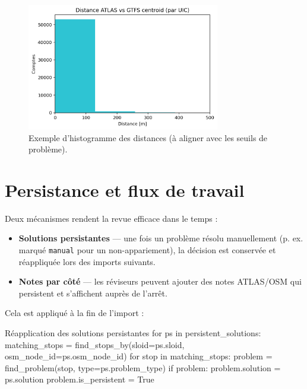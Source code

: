 \begin{figure}[h]
  \centering
  \includegraphics[width=0.75\textwidth]{../figures/plots/atlas_vs_gtfs_distance_hist.png}
  \caption{Exemple d'histogramme des distances (à aligner avec les seuils de problème).}
\end{figure}

\section{Persistance et flux de travail}
\label{sec:persist-workflow}
Deux mécanismes rendent la revue efficace dans le temps :
\begin{itemize}
  \item \textbf{Solutions persistantes} — une fois un problème résolu manuellement (p. ex. marqué \texttt{manual} pour un non-appariement), la décision est conservée et réappliquée lors des imports suivants.
  \item \textbf{Notes par côté} — les réviseurs peuvent ajouter des notes ATLAS/OSM qui persistent et s'affichent auprès de l'arrêt.
\end{itemize}

\noindent Cela est appliqué à la fin de l'import :
\begin{codebox}[language=Python]{Réapplication des solutions persistantes}
for ps in persistent_solutions:
    matching_stops = find_stops_by(sloid=ps.sloid, osm_node_id=ps.osm_node_id)
    for stop in matching_stops:
        problem = find_problem(stop, type=ps.problem_type)
        if problem:
            problem.solution = ps.solution
            problem.is_persistent = True
\end{codebox}


